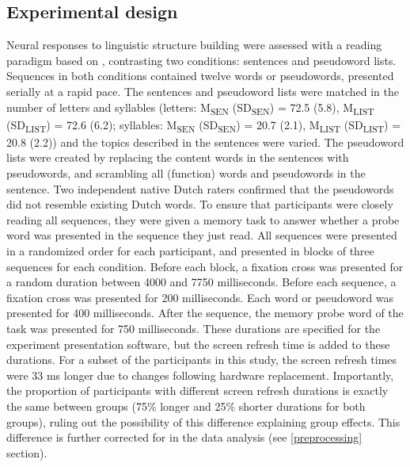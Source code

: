 \subsection*{Experimental design}
Neural responses to linguistic structure building were assessed with a reading paradigm based on \cite{fedorenko2010}, contrasting two conditions: sentences and pseudoword lists. Sequences in both conditions contained twelve words or pseudowords, presented serially at a rapid pace. The sentences and pseudoword lists were matched in the number of letters and syllables (letters: M\textsubscript{SEN} (SD\textsubscript{SEN}) = 72.5 (5.8), M\textsubscript{LIST} (SD\textsubscript{LIST}) = 72.6 (6.2); syllables: M\textsubscript{SEN} (SD\textsubscript{SEN}) = 20.7 (2.1), M\textsubscript{LIST} (SD\textsubscript{LIST}) = 20.8 (2.2)) and the topics described in the sentences were varied. The pseudoword lists were created by replacing the content words in the sentences with pseudowords, and scrambling all (function) words and pseudowords in the sentence. Two independent native Dutch raters confirmed that the pseudowords did not resemble existing Dutch words. To ensure that participants were closely reading all sequences, they were given a memory task to answer whether a probe word was presented in the sequence they just read. All sequences were presented in a randomized order for each participant, and presented in blocks of three sequences for each condition. Before each block, a fixation cross was presented for a random duration between 4000 and 7750 milliseconds. Before each sequence, a fixation cross was presented for 200 milliseconds. Each word or pseudoword was presented for 400 milliseconds. After the sequence, the memory probe word of the task was presented for 750 milliseconds. These durations are specified for the experiment presentation software, but the screen refresh time is added to these durations. For a subset of the participants in this study, the screen refresh times were 33 ms longer due to changes following hardware replacement. Importantly, the proportion of participants with different screen refresh durations is exactly the same between groups (75\% longer and 25\% shorter durations for both groups), ruling out the possibility of this difference explaining group effects. This difference is further corrected for in the data analysis (see \ref{preprocessing} section). 



